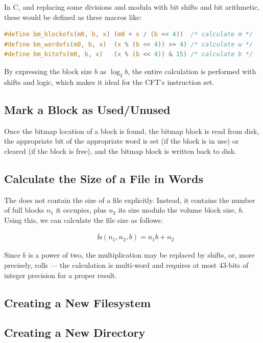 \noindent In C, and replacing some divisions and modula with bit shifts and bit
arithmetic, these would be defined as three macros like:

\begin{lstlisting}[language=c,numbers=none]
#define bm_blockofs(m0, b, x) (m0 + x / (b << 4))  /* calculate m */
#define bm_wordofs(m0, b, x)  (x % (b << 4)) >> 4) /* calculate w */
#define bm_bitofs(m0, b, x)   (x % (b << 4)) & 15) /* calculate b */
\end{lstlisting}

\noindent By expressing the block size $b$ as $\log_2{b}$, the entire calculation is
performed with shifts and logic, which makes it ideal for the CFT's instruction
set.

\subsection{Mark a Block as Used/Unused}

Once the bitmap location of a block is found, the bitmap block is read from
disk, the appropriate bit of the appropriate word is set (if the block is in
use) or cleared (if the block is free), and the bitmap block is written back to
disk.

\subsection{Calculate the Size of a File in Words}

The  does not contain the size of a file
explicitly. Instead, it contains the number of full blocks $n_1$ it
occupies, plus $n_2$ its size modulo the volume block size, $b$. Using this,
we can calculate the file size as follows:

\begin{eqnarray}
& \mbox{fs}(n_1, n_2, b) = n_1b + n_2\nonumber
\end{eqnarray}

Since $b$ is a power of two, the multiplication may be replaced by
shifts, or, more precisely, rolls — the calculation is multi-word and
requires at most 43-bits of integer precision for a proper result.

\subsection{Creating a New Filesystem}


\subsection{Creating a New Directory}

